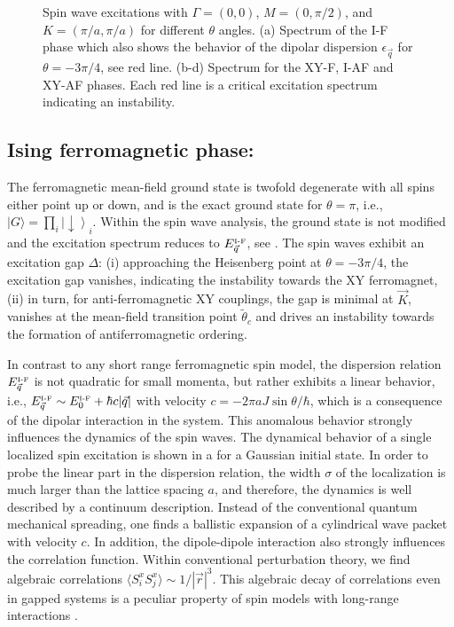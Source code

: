 \begin{figure}[ht]
    \centering
    \caption{Spin wave excitations with $\Gamma=(0,0)$, $M=(0,\pi/2)$, and $K=(\pi/a,\pi/a)$ for different $\theta$ angles. (a) Spectrum of the I-F phase which also shows the behavior of the dipolar dispersion $\epsilon_{\vec q}$ for $\theta=-3\pi/4$, see red line. (b-d) Spectrum for the XY-F, I-AF and XY-AF phases. Each red line is a critical excitation spectrum indicating an instability.}
\end{figure}



\subsection{Ising ferromagnetic phase:}
The ferromagnetic mean-field ground state is twofold degenerate with all spins
either point up or down, and is the exact ground state for $\theta =
\pi$, i.e., $|G\rangle = \prod_{i} \left|\downarrow \right\rangle_{i}$. Within the spin wave analysis,
the ground state is not modified and the excitation
spectrum reduces to $E_{{\vec q}}^{\mbox{\tiny I-F}}$, see .
The spin waves exhibit an excitation gap $\Delta$: (i) approaching the
Heisenberg point at $\theta = -3 \pi /4$, the excitation gap
vanishes, indicating the instability towards the XY ferromagnet, (ii) in
turn, for anti-ferromagnetic XY couplings, the gap is minimal at ${\vec K}$,
vanishes at the mean-field transition point $\tilde{\theta}_{c}$ and drives an instability towards the formation
of antiferromagnetic ordering.

In contrast to any short range ferromagnetic spin model, the
dispersion relation $E_{{\vec q}}^{\mbox{\tiny I-F}}$ is not quadratic for small momenta,
but rather exhibits a linear behavior, i.e., $E_{{\vec q}}^{\mbox{\tiny I-F}} \sim E_{0}^{\mbox{\tiny I-F}}+ \hbar c |{\vec q}|$ with
velocity $c= - 2 \pi a J \sin \theta /\hbar$, which is a consequence of the dipolar interaction in
the system. This anomalous behavior strongly influences the dynamics
of the spin waves.
The dynamical behavior of a single localized spin excitation is shown in a for a Gaussian initial state.
In order to probe the linear part in the dispersion relation, the width $\sigma$
of the localization is much larger than the lattice spacing $a$, and therefore, the dynamics is
well described by a continuum description.
Instead of the conventional quantum mechanical spreading, one finds
a ballistic expansion of a cylindrical wave packet with velocity $c$.
In addition, the dipole-dipole interaction also strongly influences the correlation function.
Within conventional perturbation theory, we find algebraic correlations $\langle S_{i}^{x} S_{j}^{x}\rangle \sim 1/|{\vec r}|^3$.
This algebraic decay of correlations even in gapped systems is a peculiar property of
spin models with long-range interactions \cite{Deng2005,Schuch2006}.



